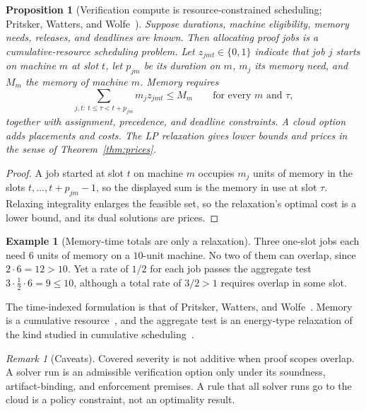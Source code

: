\documentclass[11pt]{article}
\newtheorem{proposition}[theorem]{Proposition}
\theoremstyle{definition}
\newtheorem{example}[theorem]{Example}
\theoremstyle{remark}
\newtheorem{remark}[theorem]{Remark}
\begin{document}
\begin{proposition}[Verification compute is resource-constrained scheduling; Pritsker, Watters, and
Wolfe~\cite{pritsker69}]\label{prop:scheduling}
Suppose durations, machine eligibility, memory needs, releases, and deadlines are known. Then
allocating proof jobs is a cumulative-resource scheduling problem. Let $z_{jmt}\in\{0,1\}$ indicate that
job $j$ starts on machine $m$ at slot $t$, let $p_{jm}$ be its duration on $m$, $m_j$ its memory
need, and $M_m$ the memory of machine $m$. Memory requires
\[
\sum_{j,t:\ t\le\tau<t+p_{jm}}m_jz_{jmt}\le M_m\qquad\text{for every }m\text{ and }\tau,
\]
together with assignment, precedence, and deadline constraints. A cloud option adds placements and
costs. The LP relaxation gives lower bounds and prices in the sense of Theorem~\ref{thm:prices}.
\end{proposition}
\begin{proof}
A job started at slot $t$ on machine $m$ occupies $m_j$ units of memory in the slots
$t,\dots,t+p_{jm}-1$, so the displayed sum is the memory in use at slot $\tau$. Relaxing integrality
enlarges the feasible set, so the relaxation's optimal cost is a lower bound, and its dual solutions are
prices.
\end{proof}
\begin{example}[Memory-time totals are only a relaxation]\label{ex:memory}
Three one-slot jobs each need $6$ units of memory on a $10$-unit machine. No two of them can overlap,
since $2\cdot6=12>10$. Yet a rate of $1/2$ for each job passes the aggregate test
$3\cdot\tfrac12\cdot6=9\le10$, although a total rate of $3/2>1$ requires overlap in some slot.
\end{example}
The time-indexed formulation is that of Pritsker, Watters, and Wolfe~\cite{pritsker69}. Memory is a
cumulative resource~\cite{aggoun93}, and the aggregate test is an energy-type relaxation of the kind
studied in cumulative scheduling~\cite{baptiste01}.
\begin{remark}[Caveats]
Covered severity is not additive when proof scopes overlap. A solver run is an admissible verification
option only under its soundness, artifact-binding, and enforcement premises. A rule that all solver runs
go to the cloud is a policy constraint, not an optimality result.
\end{remark}
\end{document}
